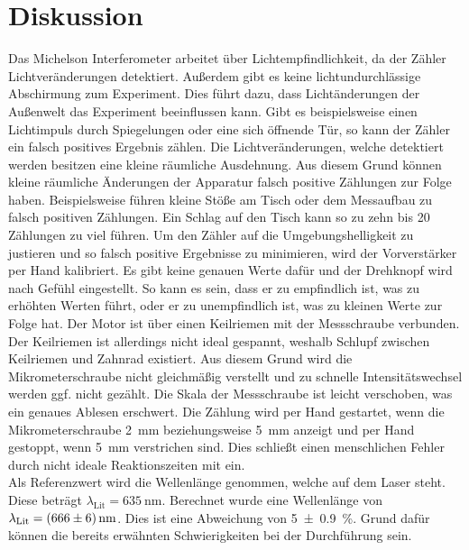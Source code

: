


\section{Diskussion}
\label{sec:Diskussion}

Das Michelson Interferometer arbeitet über Lichtempfindlichkeit, da der Zähler Lichtveränderungen detektiert. 
Außerdem gibt es keine lichtundurchlässige Abschirmung zum Experiment. Dies führt dazu, dass Lichtänderungen 
der Außenwelt das Experiment beeinflussen kann. Gibt es beispielsweise einen Lichtimpuls durch Spiegelungen 
oder eine sich öffnende Tür, so kann der Zähler ein falsch positives Ergebnis zählen. 
Die Lichtveränderungen, welche detektiert werden besitzen eine kleine räumliche Ausdehnung. Aus diesem Grund 
können kleine räumliche Änderungen der Apparatur falsch positive Zählungen zur Folge haben. Beispielsweise 
führen kleine Stöße am Tisch oder dem Messaufbau zu falsch positiven Zählungen. Ein Schlag auf den Tisch kann 
so zu zehn bis 20 Zählungen zu viel führen. Um den Zähler auf die Umgebungshelligkeit zu justieren und so 
falsch positive Ergebnisse zu minimieren, wird der Vorverstärker per Hand kalibriert. Es gibt keine genauen 
Werte dafür und der Drehknopf wird nach Gefühl eingestellt. So kann es sein, dass er zu empfindlich ist, 
was zu erhöhten Werten führt, oder er zu unempfindlich ist, was zu kleinen Werte zur Folge hat. 
Der Motor ist über einen Keilriemen mit der Messschraube verbunden. Der Keilriemen ist allerdings nicht ideal 
gespannt, weshalb Schlupf zwischen Keilriemen und Zahnrad existiert. Aus diesem Grund wird die Mikrometerschraube 
nicht gleichmäßig verstellt und zu schnelle Intensitätswechsel werden ggf. nicht gezählt. Die Skala der 
Messschraube ist leicht verschoben, was ein genaues Ablesen erschwert. Die Zählung wird per Hand gestartet, 
wenn die Mikrometerschraube \qty{2}{\milli \meter} beziehungsweise \qty{5}{\milli \meter} anzeigt und per Hand 
gestoppt, wenn \qty{5}{\milli \meter} verstrichen sind. Dies schließt einen menschlichen Fehler durch nicht 
ideale Reaktionszeiten mit ein.\\

\noindent Als Referenzwert wird die Wellenlänge genommen, welche auf dem Laser steht. Diese beträgt 
$\lambda_\text{Lit} = \qty{635}{\nano \meter}$. Berechnet wurde eine Wellenlänge von 
$\lambda_\text{Lit} = \qty{666\pm6}{\nano \meter}$. Dies ist eine Abweichung von \qty{5\pm0.9}{\percent}.
Grund dafür können die bereits erwähnten Schwierigkeiten bei der Durchführung sein.\\

